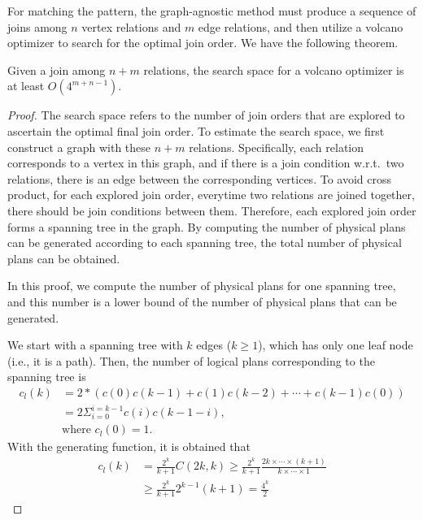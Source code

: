 For matching the pattern, the graph-agnostic method must produce a sequence of joins among $n$ vertex relations and $m$ edge relations, and then utilize a volcano optimizer to search for the optimal join order. We have the following theorem.

\begin{theorem}
    \label{thm:complexity-of-volcano}
    Given a join among $n + m$ relations, the search space for a volcano optimizer is at least $O(4^{m+n-1})$.
\end{theorem}

\begin{proof}
    The search space refers to the number of join orders that are explored to ascertain the optimal final join order.
    To estimate the search space, we first construct a graph with these $n + m$ relations.
    Specifically, each relation corresponds to a vertex in this graph, and if there is a join condition w.r.t.~two relations, there is an edge between the corresponding vertices.
    To avoid cross product, for each explored join order, everytime two relations are joined together, there should be join conditions between them.
    Therefore, each explored join order forms a spanning tree in the graph.
    By computing the number of physical plans can be generated according to each spanning tree, the total number of physical plans can be obtained.

    In this proof, we compute the number of physical plans for one spanning tree, and this number is a lower bound of the number of physical plans that can be generated.

    We start with a spanning tree with $k$ edges ($k \geq 1$), which has only one leaf node (i.e., it is a path).
    Then, the number of logical plans corresponding to the spanning tree is
    \begin{equation*}
        \begin{split}
            c_l(k) & = 2 * (c(0)c(k-1) + c(1)c(k-2) + \cdots + c(k-1)c(0)) \\
            & = 2\Sigma_{i=0}^{i=k-1}c(i)c(k-1-i), \\
            & \text{where } c_l(0) = 1.
        \end{split}
    \end{equation*}
    With the generating function, it is obtained that
    \begin{equation*}
        \begin{split}
            c_l(k) & = \frac{2^k}{k+1}C(2k, k) \geq \frac{2^k}{k+1}\frac{2k \times \cdots \times (k+1)}{k \times \cdots \times 1} \\
            & \geq \frac{2^k}{k+1}2^{k-1}(k+1) = \frac{4^k}{2}
        \end{split}
    \end{equation*}


\end{proof}
